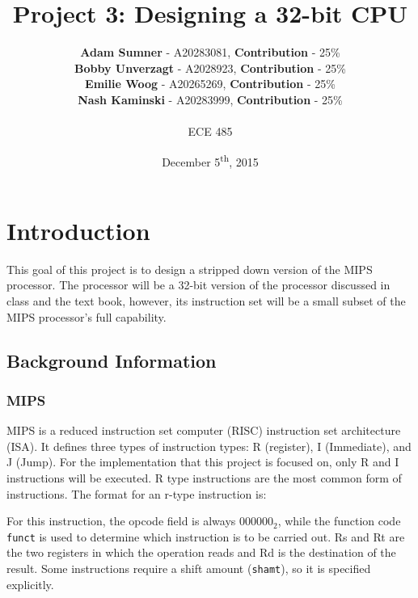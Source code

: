 \documentclass[12pt]{article}
\title{\textbf{Project 3: Designing a 32-bit CPU}}
\author{\textbf{Adam Sumner} - A20283081, \textbf{Contribution} - 25\% \\
		\textbf{Bobby Unverzagt} - A2028923, \textbf{Contribution} - 25\% \\
		\textbf{Emilie Woog} - A20265269, \textbf{Contribution} - 25\% \\
		\textbf{Nash Kaminski} - A20283999, \textbf{Contribution} - 25\% \\ ~\\ ECE 485}
\date{December 5\textsuperscript{th}, 2015}
\begin{document}
\maketitle

\section{Introduction}
This goal of this project is to design a stripped down version of the MIPS processor. The processor will be a 32-bit version of the processor discussed in class and the text book, however, its instruction set will be a small subset of the MIPS processor's full capability. 

\subsection{Background Information}
\subsubsection{MIPS}
MIPS is a reduced instruction set computer (RISC) instruction set architecture (ISA). It defines three types of instruction types: R (register), I (Immediate), and J (Jump). For the implementation that this project is focused on, only R and I instructions will be executed. R type instructions are the most common form of instructions. The format for an r-type instruction is:

\begin{center}

\end{center}

\noindent For this instruction, the opcode field is always $000000_2$, while the function code \texttt{funct} is used to determine which instruction is to be carried out. Rs and Rt are the two registers in which the operation reads and Rd is the destination of the result. Some instructions require a shift amount (\texttt{shamt}), so it is specified explicitly.
\\
\end{document}
